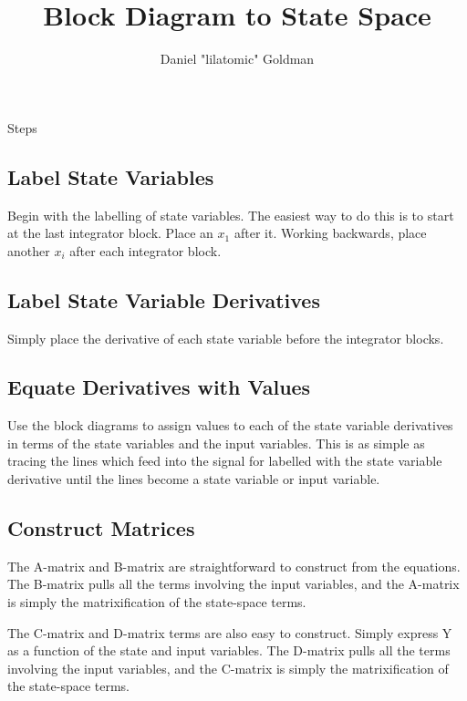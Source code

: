 \documentclass{../templates/topic}
\title{Block Diagram to State Space}
\author{Daniel "lilatomic" Goldman}
\begin{document}
\maketitle

\begin{section}{Steps}
	
	\subsection{Label State Variables}
		Begin with the labelling of state variables. The easiest way to do this is to start at the last integrator block. Place an $x_1$ after it. Working backwards, place another $x_i$ after each integrator block.
		
	\subsection{Label State Variable Derivatives}
		Simply place the derivative of each state variable before the integrator blocks.
		
	\subsection{Equate Derivatives with Values}
		Use the block diagrams to assign values to each of the state variable derivatives in terms of the state variables and the input variables. This is as simple as tracing the lines which feed into the signal for labelled with the state variable derivative until the lines become a state variable or input variable.
		
	\subsection{Construct Matrices}
		The A-matrix and B-matrix are straightforward to construct from the equations. The B-matrix pulls all the terms involving the input variables, and the A-matrix is simply the matrixification of the state-space terms.
		
		The C-matrix and D-matrix terms are also easy to construct. Simply express Y as a function of the state and input variables. The D-matrix pulls all the terms involving the input variables, and the C-matrix is simply the matrixification of the state-space terms.
	
	
\end{section}
\end{document}
